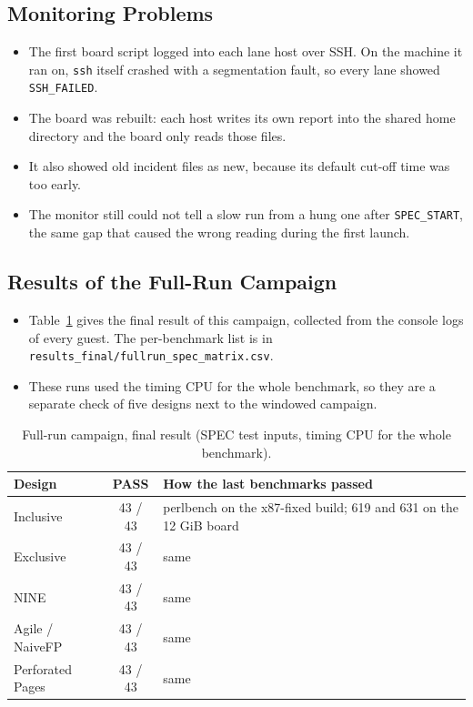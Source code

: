 \subsection{Monitoring Problems}
\begin{itemize}
    \item The first board script logged into each lane host over SSH. On the machine it ran on, \texttt{ssh} itself crashed with a segmentation fault, so every lane showed \texttt{SSH\_FAILED}.
    \item The board was rebuilt: each host writes its own report into the shared home directory and the board only reads those files.
    \item It also showed old incident files as new, because its default cut-off time was too early.
    \item The monitor still could not tell a slow run from a hung one after \texttt{SPEC\_START}, the same gap that caused the wrong reading during the first launch.
\end{itemize}

\subsection{Results of the Full-Run Campaign}
\begin{itemize}
    \item Table~\ref{tab:chr_fullrun} gives the final result of this campaign, collected from the console logs of every guest. The per-benchmark list is in \texttt{results\_final/fullrun\_spec\_matrix.csv}.
    \item These runs used the timing CPU for the whole benchmark, so they are a separate check of five designs next to the windowed campaign.
\end{itemize}

\begin{table}[H]
\centering
\small
\caption{Full-run campaign, final result (SPEC test inputs, timing CPU for the whole benchmark).}
\label{tab:chr_fullrun}
\begin{tabularx}{\textwidth}{l c X}
\toprule
\textbf{Design} & \textbf{PASS} & \textbf{How the last benchmarks passed} \\
\midrule
Inclusive & 43 / 43 & perlbench on the x87-fixed build; 619 and 631 on the 12 GiB board \\
Exclusive & 43 / 43 & same \\
NINE & 43 / 43 & same \\
Agile / NaiveFP & 43 / 43 & same \\
Perforated Pages & 43 / 43 & same \\
\bottomrule
\end{tabularx}
\end{table}

